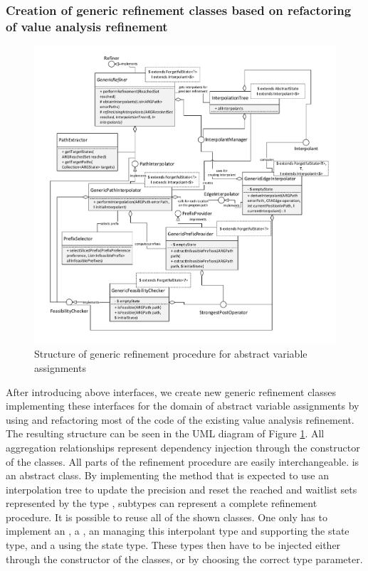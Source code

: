 \subsubsection{Creation of generic refinement classes based on refactoring of value analysis refinement}
\begin{figure}[h!]
\includegraphics[width=1.2\linewidth]{implementationCegar/RefinementRefactored}
\caption{Structure of generic refinement procedure for abstract variable assignments}
\label{fig:refGeneric}
\end{figure}
After introducing above interfaces, we create new generic refinement classes implementing these interfaces for the domain of abstract variable assignments by using and refactoring most of the code of the existing value analysis refinement.
The resulting structure can be seen in the UML diagram of Figure \ref{fig:refGeneric}.
All aggregation relationships represent dependency injection through the constructor of the classes.
All parts of the refinement procedure are easily interchangeable.
 is an abstract class.
By implementing the method  that is expected to use an interpolation tree to update the precision and reset the reached and waitlist sets represented by the type , subtypes can represent a complete refinement procedure.
It is possible to reuse all of the shown classes.
One only has to implement an , a , an  managing this interpolant type and supporting the state type, and a  using the state type.
These types then have to be injected either through the constructor of the  classes, or by choosing the correct type parameter.
